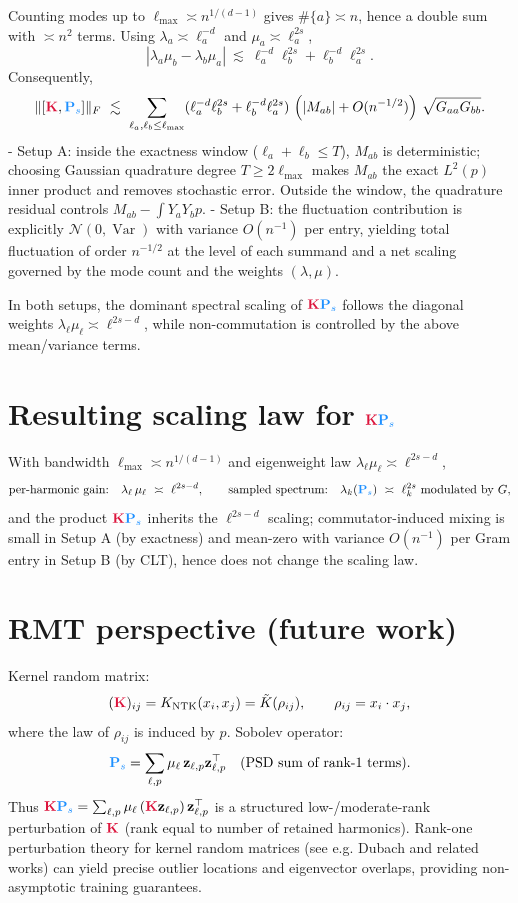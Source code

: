 \documentclass{article}
\newcommand{\Kmat}{\textcolor{kernelcolor}{\mathbf{K}}}
\newcommand{\Psmat}{\textcolor{sobolevcolor}{\mathbf{P}_s}}
\begin{document}
Counting modes up to $\ell_{\max}\asymp n^{1/(d-1)}$ gives $\#\{a\}\asymp n$, hence a double sum with $\asymp n^2$ terms. Using $\lambda_a\asymp \ell_a^{-d}$ and $\mu_a\asymp \ell_a^{2s}$,
\[
|\lambda_a\mu_b-\lambda_b\mu_a|\ \lesssim\ \ell_a^{-d}\ell_b^{2s}+\ell_b^{-d}\ell_a^{2s}.
\]
Consequently,
\[
\|[\Kmat,\Psmat]\|_F\ \lesssim\ \sum_{\ell_a,\ell_b\le \ell_{\max}}
(\ell_a^{-d}\ell_b^{2s}+\ell_b^{-d}\ell_a^{2s})\ \Big(|M_{ab}|+O(n^{-1/2})\Big)\ \sqrt{G_{aa}G_{bb}}.
\]
- Setup A: inside the exactness window ($\ell_a+\ell_b\le T$), $M_{ab}$ is deterministic; choosing Gaussian quadrature degree $T\ge 2\ell_{\max}$ makes $M_{ab}$ the exact $L^2(p)$ inner product and removes stochastic error. Outside the window, the quadrature residual controls $M_{ab}-\int Y_aY_b p$.
- Setup B: the fluctuation contribution is explicitly $\mathcal{N}(0,\operatorname{Var})$ with variance $O(n^{-1})$ per entry, yielding total fluctuation of order $n^{-1/2}$ at the level of each summand and a net scaling governed by the mode count and the weights $(\lambda,\mu)$.

In both setups, the dominant spectral scaling of $\Kmat\Psmat$ follows the diagonal weights $\lambda_\ell\mu_\ell\asymp \ell^{2s-d}$, while non-commutation is controlled by the above mean/variance terms.

\section{Resulting scaling law for $\Kmat\Psmat$}
With bandwidth $\ell_{\max}\asymp n^{1/(d-1)}$ and eigenweight law $\lambda_\ell\mu_\ell\asymp \ell^{2s-d}$,
\[
\text{per-harmonic gain:}\quad \lambda_\ell\,\mu_\ell\ \asymp\ \ell^{2s-d},\qquad
\text{sampled spectrum:}\quad \lambda_k(\Psmat)\ \asymp\ \ell_k^{2s}\ \text{modulated by }G,
\]
and the product $\Kmat\Psmat$ inherits the $\ell^{2s-d}$ scaling; commutator-induced mixing is small in Setup A (by exactness) and mean-zero with variance $O(n^{-1})$ per Gram entry in Setup B (by CLT), hence does not change the scaling law.

\section{RMT perspective (future work)}
Kernel random matrix:
\[
(\Kmat)_{ij}=K_{\mathrm{NTK}}(x_i,x_j)=\tilde K(\rho_{ij}),\qquad \rho_{ij}=x_i\cdot x_j,
\]
where the law of $\rho_{ij}$ is induced by $p$. Sobolev operator:
\[
\Psmat=\sum_{\ell,p}\mu_\ell\,\mathbf{z}_{\ell,p}\mathbf{z}_{\ell,p}^{\top}\quad\text{(PSD sum of rank-1 terms)}.
\]
Thus $\Kmat\Psmat=\sum_{\ell,p}\mu_\ell\,(\Kmat\mathbf{z}_{\ell,p})\,\mathbf{z}_{\ell,p}^{\top}$ is a structured low-/moderate-rank perturbation of $\Kmat$ (rank equal to number of retained harmonics). Rank-one perturbation theory for kernel random matrices (see e.g. Dubach and related works) can yield precise outlier locations and eigenvector overlaps, providing non-asymptotic training guarantees.
\end{document}
